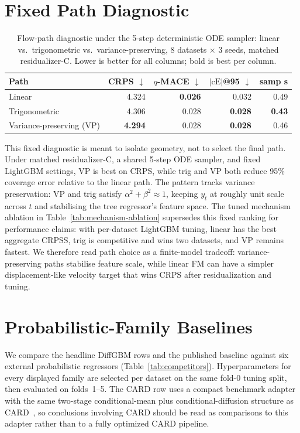 \documentclass{article}
\begin{document}
\section{Fixed Path Diagnostic}\label{app:path}

\begin{table}[!h]
  \centering
  \caption{Flow-path diagnostic under the 5-step deterministic ODE sampler: linear vs.\ trigonometric vs.\ variance-preserving, 8 datasets $\times$ 3 seeds, matched residualizer-C. Lower is better for all columns; bold is best per column.}\label{tab:path}
  \footnotesize
  \begin{tabular}{lrrrr}
    \toprule
    Path & CRPS $\downarrow$ & $q$-MACE $\downarrow$ & $|\text{cE}|$@95 $\downarrow$ & samp s \\
    \midrule
    Linear         & 4.324 & \textbf{0.026} & 0.032 & 0.49 \\
    Trigonometric  & 4.306 & 0.028 & \textbf{0.028} & \textbf{0.43} \\
    Variance-preserving (VP) & \textbf{4.294} & 0.028 & \textbf{0.028} & 0.46 \\
    \bottomrule
  \end{tabular}
\end{table}

This fixed diagnostic is meant to isolate geometry, not to select the final path. Under matched residualizer-C, a shared 5-step ODE sampler, and fixed LightGBM settings, VP is best on CRPS, while trig and VP both reduce 95\% coverage error relative to the linear path. The pattern tracks variance preservation: VP and trig satisfy $\alpha^2+\beta^2 \approx 1$, keeping $y_t$ at roughly unit scale across $t$ and stabilising the tree regressor's feature space. The tuned mechanism ablation in Table~\ref{tab:mechanism-ablation} supersedes this fixed ranking for performance claims: with per-dataset LightGBM tuning, linear has the best aggregate CRPSS, trig is competitive and wins two datasets, and VP remains fastest. We therefore read path choice as a finite-model tradeoff: variance-preserving paths stabilise feature scale, while linear FM can have a simpler displacement-like velocity target that wins CRPS after residualization and tuning.

\section{Probabilistic-Family Baselines}\label{app:competitors}

We compare the headline DiffGBM rows and the published baseline against six external probabilistic regressors (Table~\ref{tab:competitors}). Hyperparameters for every displayed family are selected per dataset on the same fold-0 tuning split, then evaluated on folds~1--5. The CARD row uses a compact benchmark adapter with the same two-stage conditional-mean plus conditional-diffusion structure as CARD~\citep{han2022card}, so conclusions involving CARD should be read as comparisons to this adapter rather than to a fully optimized CARD pipeline.
\end{document}
